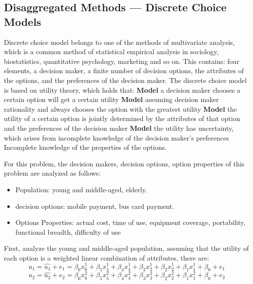 \documentclass[../mcmpaper]{subfiles}
\begin{document}
\subsection{Disaggregated Methods --- Discrete Choice Models}
Discrete choice model belongs to one of the methods of multivariate analysis, which is a common method of statistical empirical analysis in sociology, biostatistics, quantitative psychology, marketing and so on. This contains: four elements, a decision maker, a finite number of decision options, the attributes of the options, and the preferences of the decision maker. The discrete choice model is based on utility theory, which holds that: \textbf{Model}  a decision maker chooses a certain option will get a certain utility \textbf{Model}  assuming decision maker rationality and always chooses the option with the greatest utility \textbf{Model}  the utility of a certain option is jointly determined by the attributes of that option and the preferences of the decision maker \textbf{Model}  the utility has uncertainty, which arises from incomplete knowledge of the decision maker's preferences Incomplete knowledge of the properties of the options.
\par
For this problem, the decision makers, decision options, option properties of this problem are analyzed as follows:
\begin{itemize}[nosep]
    \item Population: young and middle-aged, elderly.
    \item decision options: mobile payment, bus card payment.
    \item Options Properties: actual cost, time of use, equipment coverage, portability, functional breadth, difficulty of use
\end{itemize}
\par
First, analyze the young and middle-aged population, assuming that the utility of each option is a weighted linear combination of attributes, there are:
\begin{equation}
u_{1}=\widehat{u_{1}}+e_{1}=\beta_{6} x_{6}^{1}+\beta_{5} x_{5}^{1}+\beta_{4} x_{4}^{1}+\beta_{3} x_{3}^{1}+\beta_{2} x_{2}^{1}+\beta_{1} x_{1}^{1}+\beta_{0}+e_{1}
\end{equation}
\begin{equation}
u_{2}=\widehat{u_{2}}+e_{2}=\beta_{6} x_{6}^{2}+\beta_{5} x_{5}^{2}+\beta_{4} x_{4}^{2}+\beta_{3} x_{3}^{2}+\beta_{2} x_{2}^{2}+\beta_{1} x_{1}^{2}+\beta_{0}+e_{2}
\end{equation}
\end{document}
